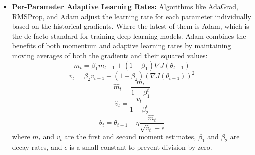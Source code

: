 \begin{itemize}
	A more refined version is the \textbf{Nesterov Accelerated Gradient (NAG)}. In NAG, the gradient is computed not at the current parameters but at the anticipated future position of the parameters:
	\[
	\Delta \theta_{I} = -\eta \nabla J(\theta_{I-1} + \alpha \Delta \theta_{I-1}) + \alpha \Delta \theta_{I-1}
	\]
	\[
	\theta_{I} = \theta_{I-1} + \Delta \theta_{I}
	\]
	
	
	\item \textbf{Per-Parameter Adaptive Learning Rates:} Algorithms like AdaGrad, RMSProp, and Adam adjust the learning rate for each parameter individually based on the historical gradients. Where the latest of them is Adam, which is the de-facto standard for training deep learning models. Adam combines the benefits of both momentum and adaptive learning rates by maintaining moving averages of both the gradients and their squared values:
	\[
	m_{t} = \beta_1 m_{t-1} + (1 - \beta_1) \nabla J(\theta_{t-1})
	\]
	\[v_{t} = \beta_2 v_{t-1} + (1 - \beta_2) (\nabla J(\theta_{t-1}))^2
	\]
	\[\hat{m}_{t} = \frac{m_{t}}{1 - \beta_1^t}
	\]
	\[\hat{v}_{t} = \frac{v_{t}}{1 - \beta_2^t}
	\]
	\[\theta_{t} = \theta_{t-1} - \eta \frac{\hat{m}_{t}}{\sqrt{\hat{v}_{t}} + \epsilon}
	\]
	where \(m_t\) and \(v_t\) are the first and second moment estimates, \(\beta_1\) and \(\beta_2\) are decay rates, and \(\epsilon\) is a small constant to prevent division by zero.
\end{itemize}


